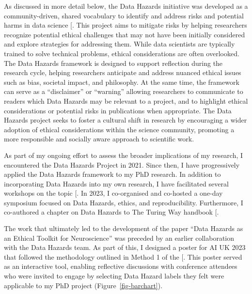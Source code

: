 \documentclass[
  11pt,
  letterpaper,
]{scrreprt}
\begin{document}
As discussed in more detail below, the Data Hazards initiative was
developed as a community-driven, shared vocabulary to identify and
address risks and potential harms in data science
{[}\citeproc{ref-zelenka2023Data}{425}{]}. This project aims to mitigate
risks by helping researchers recognize potential ethical challenges that
may not have been initially considered and explore strategies for
addressing them. While data scientists are typically trained to solve
technical problems, ethical considerations are often overlooked. The
Data Hazards framework is designed to support reflection during the
research cycle, helping researchers anticipate and address nuanced
ethical issues such as bias, societal impact, and philosophy. At the
same time, the framework can serve as a ``disclaimer'' or ``warning''
allowing researchers to communicate to readers which Data Hazards may be
relevant to a project, and to highlight ethical considerations or
potential risks in publications when appropriate. The Data Hazards
project seeks to foster a cultural shift in research by encouraging a
wider adoption of ethical considerations within the science community,
promoting a more responsible and socially aware approach to scientific
work.

As part of my ongoing effort to assess the broader implications of my
research, I encountered the Data Hazards Project in 2021. Since then, I
have progressively applied the Data Hazards framework to my PhD
research. In addition to incorporating Data Hazards into my own
research, I have facilitated several workshops on the topic
{[}\citeproc{ref-roman-garcia2022Data}{426}{]}. In 2023, I co-organised
and co-hosted a one-day symposium focused on Data Hazards, ethics, and
reproducibility. Furthermore, I co-authored a chapter on Data Hazards to
The Turing Way handbook
{[}\citeproc{ref-turingwaycommunity2019TuringWayHandbook}{356}{]}.

The work that ultimately led to the development of the paper ``Data
Hazards as an Ethical Toolkit for Neuroscience'' was preceded by an
earlier collaboration with the Data Hazards team. As part of this, I
designed a poster for AI UK 2023 that followed the methodology outlined
in Method 1 of the {[}\citeproc{ref-romangarcia2023Data}{379}{]}. This
poster served as an interactive tool, enabling reflective discussions
with conference attendees who were invited to engage by selecting Data
Hazard labels they felt were applicable to my PhD project
(Figure~\ref{fig-barchart}).
\end{document}
